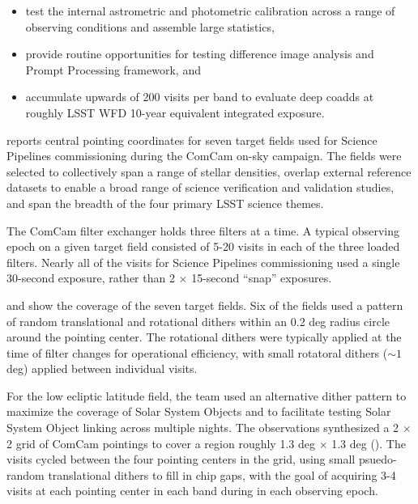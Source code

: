 \begin{itemize}
    \item test the internal astrometric and photometric calibration across a range of observing conditions and assemble large statistics,
    \item provide routine opportunities for testing difference image analysis and Prompt Processing framework, and
    \item accumulate upwards of 200 visits per band to evaluate deep coadds at roughly LSST WFD 10-year equivalent integrated exposure.
\end{itemize}

 reports central pointing coordinates for seven target fields used for Science Pipelines commissioning during the ComCam on-sky campaign.
The fields were selected to collectively span a range of stellar densities, overlap external reference datasets to enable a broad range of science verification and validation studies, and span the breadth of the four primary LSST science themes.

The ComCam filter exchanger holds three filters at a time.
A typical observing epoch on a given target field consisted of 5-20 visits in each of the three loaded filters.
Nearly all of the visits for Science Pipelines commissioning used a single 30-second exposure, rather than 2 $\times$ 15-second ``snap'' exposures.

 and  show the coverage of the seven target fields.
Six of the fields used a pattern of random translational and rotational dithers within an 0.2 deg radius circle around the pointing center.
The rotational dithers were typically applied at the time of filter changes for operational efficiency, with small rotatoral dithers ($\sim1$ deg) applied between individual visits.

For the low ecliptic latitude field, the team used an alternative dither pattern to maximize the coverage of Solar System Objects and to facilitate testing Solar System Object linking across multiple nights.
The observations synthesized a 2 $\times$ 2 grid of ComCam pointings to cover a region roughly 1.3 deg $\times$ 1.3 deg ().
The visits cycled between the four pointing centers in the grid, using small psuedo-random translational dithers to fill in chip gaps, with the goal of acquiring 3-4 visits at each pointing center in each band during in each observing epoch.

